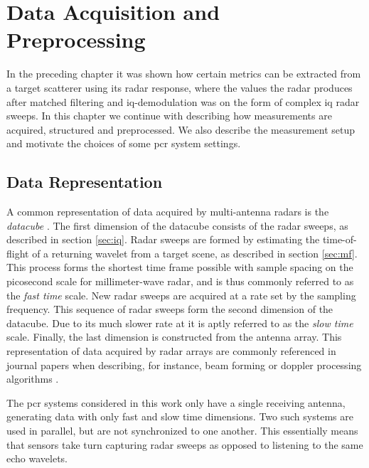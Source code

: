 \chapter{Data Acquisition and Preprocessing}\label{ch:3}

In the preceding chapter it was shown how certain metrics can be extracted from a target scatterer using its radar response, where the values the radar produces after matched filtering and \gls{iq}-demodulation was on the form of complex \gls{iq} radar sweeps. In this chapter we continue with describing how measurements are acquired, structured and preprocessed. We also describe the measurement setup and motivate the choices of some \gls{pcr} system settings.

\section{Data Representation}

A common representation of data acquired by multi-antenna radars is the \emph{datacube} \citep{richards_2014}. The first dimension of the datacube consists of the radar sweeps, as described in section \ref{sec:iq}. Radar sweeps are formed by estimating the time-of-flight of a returning wavelet from a target scene, as described in section \ref{sec:mf}. This process forms the shortest time frame possible with sample spacing on the picosecond scale for millimeter-wave radar, and is thus commonly referred to as the \emph{fast time} scale. New radar sweeps are acquired at a rate set by the sampling frequency. This sequence of radar sweeps form the second dimension of the datacube. Due to its much slower rate at it is aptly referred to as the \emph{slow time} scale. Finally, the last dimension is constructed from the antenna array. This representation of data acquired by radar arrays are commonly referenced in journal papers when describing, for instance, beam forming or doppler processing algorithms \citep{gentile_donovan_2018}. 

The \gls{pcr} systems considered in this work only have a single receiving antenna, generating data with only fast and slow time dimensions. Two such systems are used in parallel, but are not synchronized to one another. This essentially means that sensors take turn capturing radar sweeps as opposed to listening to the same echo wavelets. %

